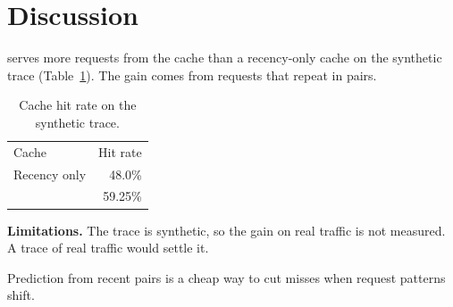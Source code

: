 \section{Discussion}
\label{sec:discussion}

\examplesys{} serves more requests from the cache than a recency-only cache on the synthetic trace (Table~\ref{tab:hits}).
The gain comes from requests that repeat in pairs.

\begin{table}[t]
\caption{Cache hit rate on the synthetic trace.}
\label{tab:hits}
\centering
\begin{tabular}{lr}
Cache & Hit rate \\
Recency only & 48.0\% \\
\examplesys{} & 59.25\% \\
\end{tabular}
\end{table}

\textbf{Limitations.} The trace is synthetic, so the gain on real traffic is not measured.
A trace of real traffic would settle it.

Prediction from recent pairs is a cheap way to cut misses when request patterns shift.
